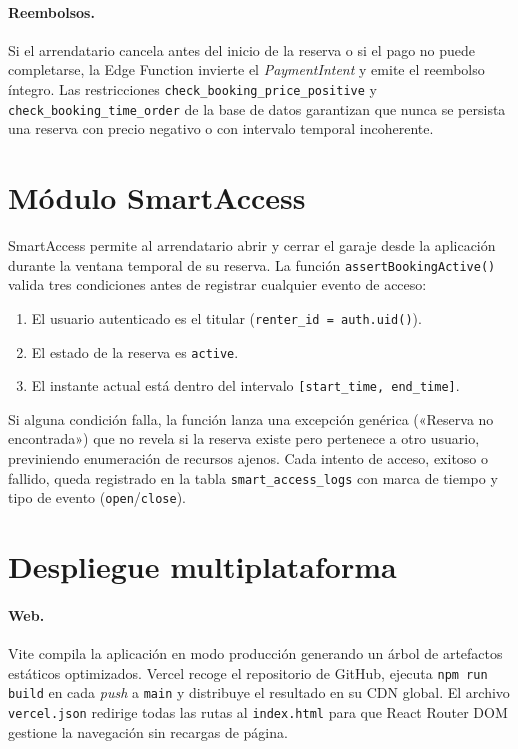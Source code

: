 \paragraph{Reembolsos.}
Si el arrendatario cancela antes del inicio de la reserva o si el pago no puede completarse, la Edge Function invierte el \textit{PaymentIntent} y emite el reembolso íntegro. Las restricciones \texttt{check\_booking\_price\_positive} y \texttt{check\_booking\_time\_order} de la base de datos garantizan que nunca se persista una reserva con precio negativo o con intervalo temporal incoherente.

\section{Módulo SmartAccess}
\label{sec:impl_smartaccess}

SmartAccess permite al arrendatario abrir y cerrar el garaje desde la aplicación durante la ventana temporal de su reserva. La función \texttt{assertBookingActive()} valida tres condiciones antes de registrar cualquier evento de acceso:

\begin{enumerate}
  \item El usuario autenticado es el titular (\texttt{renter\_id = auth.uid()}).
  \item El estado de la reserva es \texttt{active}.
  \item El instante actual está dentro del intervalo \texttt{[start\_time, end\_time]}.
\end{enumerate}

Si alguna condición falla, la función lanza una excepción genérica («Reserva no encontrada») que no revela si la reserva existe pero pertenece a otro usuario, previniendo enumeración de recursos ajenos. Cada intento de acceso, exitoso o fallido, queda registrado en la tabla \texttt{smart\_access\_logs} con marca de tiempo y tipo de evento (\texttt{open}/\texttt{close}).

\section{Despliegue multiplataforma}
\label{sec:impl_despliegue}

\paragraph{Web.}
Vite compila la aplicación en modo producción generando un árbol de artefactos estáticos optimizados. Vercel recoge el repositorio de GitHub, ejecuta \texttt{npm run build} en cada \textit{push} a \texttt{main} y distribuye el resultado en su CDN global. El archivo \texttt{vercel.json} redirige todas las rutas al \texttt{index.html} para que React Router DOM gestione la navegación sin recargas de página.

